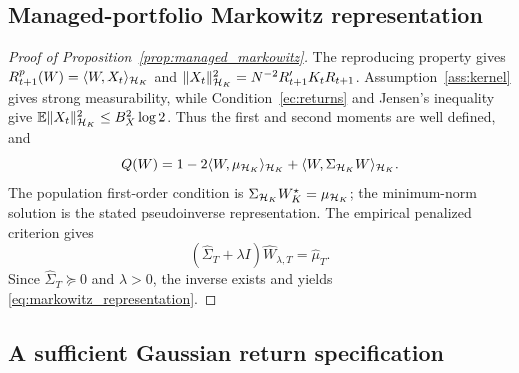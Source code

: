 \subsection{Managed-portfolio Markowitz representation}
\label{app:managed_markowitz}

\begin{proof}[Proof of Proposition~\ref{prop:managed_markowitz}]
The reproducing property gives
$R^p_{t+1}(W)=\langle W,X_t\rangle_{\mathcal{H}_K}$ and
$\|X_t\|_{\mathcal{H}_K}^2=N^{-2}R_{t+1}'K_tR_{t+1}$.
Assumption~\ref{ass:kernel} gives strong measurability, while
Condition~\ref{ec:returns} and Jensen's inequality give
$\mathbb{E}\|X_t\|_{\mathcal{H}_K}^2\leq B_X^2\log2$.
Thus the first and second moments are well defined, and
\[
Q(W)=1-2\langle W,\mu_{\mathcal{H}_K}\rangle_{\mathcal{H}_K}
+\langle W,\Sigma_{\mathcal{H}_K}W\rangle_{\mathcal{H}_K}.
\]
The population first-order condition is
$\Sigma_{\mathcal{H}_K}W_K^\star=\mu_{\mathcal{H}_K}$; the minimum-norm solution is the
stated pseudoinverse representation. The empirical penalized criterion
gives
\[
(\widehat\Sigma_T+\lambda I)\widehat W_{\lambda,T}=\widehat\mu_T.
\]
Since $\widehat\Sigma_T\succeq0$ and $\lambda>0$, the inverse exists and
yields \eqref{eq:markowitz_representation}.
\end{proof}

\subsection{A sufficient Gaussian return specification}
\label{app:primitive_consequences}

